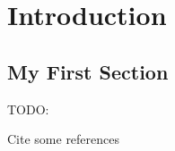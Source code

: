 \chapter{Introduction}
\label{cha:intro}


\section{My First Section}

TODO:

Cite some references \cite{dyke1994, latex2012}